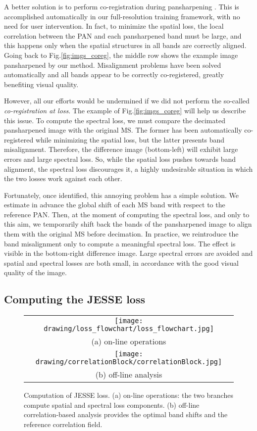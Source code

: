 \documentclass[journal]{IEEEtran}
\begin{document}
A better solution is to perform co-registration during pansharpening \cite{Ciotola2022, Seo2020, Lee2021}.
This is accomplished automatically in our full-resolution training framework, with no need for user intervention.
In fact, to minimize the spatial loss, the local correlation between the PAN and each pansharpened band must be large,
and this happens only when the spatial structures in all bands are correctly aligned.
Going back to Fig.\ref{fig:imgs_coreg}, the middle row shows the example image pansharpened by our method.
Misalignment problems have been solved automatically and all bands appear to be correctly co-registered, greatly benefiting visual quality.

However, all our efforts would be undermined if we did not perform the so-called {\em co-registration at loss}.
The example of Fig.\ref{fig:imgs_coreg} will help us describe this issue.
To compute the spectral loss, we must compare the decimated pansharpened image with the original MS.
The former has been automatically co-registered while minimizing the spatial loss, but the latter presents band misalignment.
Therefore, the difference image (bottom-left) will exhibit large errors and large spectral loss.
So, while the spatial loss pushes towards band alignment, the spectral loss discourages it,
a highly undesirable situation in which the two losses work against each other.

Fortunately, once identified, this annoying problem has a simple solution.
We estimate in advance the global shift of each MS band with respect to the reference PAN.
Then, at the moment of computing the spectral loss, and only to this aim, we temporarily shift back the bands of the pansharpened image to align them with the original MS before decimation.
In practice, we reintroduce the band misalignment only to compute a meaningful spectral loss.
The effect is visible in the bottom-right difference image.
Large spectral errors are avoided and spatial and spectral losses are both small, in accordance with the good visual quality of the image.


\subsection{Computing the JESSE loss}

\begin{figure}
\centering
\begin{tabular}{c}
\texttt{[image: drawing/loss\_flowchart/loss\_flowchart.jpg]}     \\[1mm]
(a) on-line operations                                                      \\[6mm]
\texttt{[image: drawing/correlationBlock/correlationBlock.jpg]} \\[2mm]
(b) off-line analysis
\end{tabular}

\vspace{2mm}
\caption{
Computation of JESSE loss.
(a) on-line operations: the two branches compute spatial and spectral loss components.
(b) off-line correlation-based analysis provides the optimal band shifts and the reference correlation field.
}
\label{fig:coreg_alg}
\end{figure}
\end{document}
